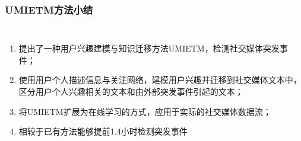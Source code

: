 \begin{frame}
\frametitle{\noindent UMIETM方法小结}	
\begin{columns}

\begin{enumerate}
	\item 提出了一种用户兴趣建模与知识迁移方法UMIETM，检测社交媒体突发事件；
	\item 使用用户个人描述信息与关注网络，建模用户兴趣并迁移到社交媒体文本中，区分用户个人兴趣相关的文本和由外部突发事件引起的文本；
	\item 将UMIETM扩展为在线学习的方式，应用于实际的社交媒体数据流；
	\item 相较于已有方法能够提前1.4小时检测突发事件
\end{enumerate}


\end{columns}

\end{frame}
